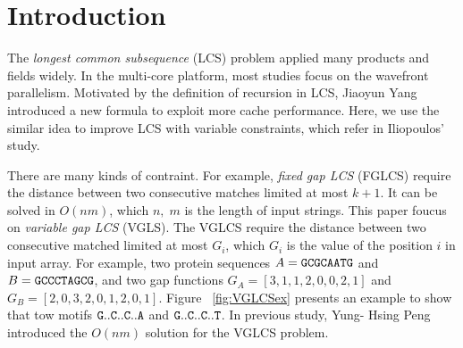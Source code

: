 \section{Introduction} %
\label{sec:Introduction}

The \emph{longest common subsequence} (LCS) problem applied many
products and fields widely.  In the multi-core platform, most studies
focus on the wavefront parallelism. Motivated by the definition of
recursion in LCS, Jiaoyun Yang introduced a new formula to exploit
more cache performance.  Here, we use the similar idea to improve LCS
with variable constraints, which refer in Iliopoulos' study. 

\iffalse
最長共同子序列 (\emph{longest common subsequence}, LCS)廣泛地使用在各個應用上。
在多核心平台下，大多數的研究專注於如何高效率地在波前平行 (wavefront parallelism)，
而 Jiaoyun Yang ~\cite{jiaoyun} 提出的論文中改變一般的 LCS 遞迴定義以得到更好快取使用率。
在這篇論文中，針對在 Iliopoulos ~\cite{iliopoulos} 提及的約束條件下的 LCS 問題使用相關的想法來改善效能。
\fi

There are many kinds of contraint.  For example, \emph{fixed gap LCS}
(FGLCS) require the distance between two consecutive matches limited
at most $k+1$.  It can be solved in $O(nm)$, which $n, \; m$ is the
length of input strings. This paper foucus on \emph{variable gap LCS}
(VGLS).  The VGLCS require the distance between two consecutive
matched limited at most $G_i$, which $G_i$ is the value of the
position $i$ in input array. For example, two protein sequences $A =
\tt{GCGCAATG}$ and $B = \tt{GCCCTAGCG}$, and two gap functions $G_A =
[3, 1, 1, 2, 0, 0, 2, 1]$ and $G_B = [2, 0, 3, 2, 0, 1, 2, 0, 1]$.
Figure ~\ref{fig:VGLCSex} presents an example to show that tow motifs
$\tt{G..C..C..A}$ and $\tt{G..C..C..T}$.  In previous study, Yung-
Hsing Peng \cite{Yang2010AnEP} introduced the $O(nm)$ solution for the
VGLCS problem.

\iffalse
在約束條件下的 LCS 中，如 \emph{fixed gap LCS } (FGLCS)要求任兩個挑選的距離在相對應的另一個字串中相等，
同時距離最大為 $k+1$，可在時間複雜度在 $O(nm)$ 內解決，其中 $n$, $m$ 分別為兩個輸入的字串長度。
我們將在這篇論文針對 \emph{variable gap LCS} (VGLCS) 進行探討。
在 VGLCS 中，對各個不同的位置提供約束限制，如目前給定兩個字串 $A = \tt{GCGCAATG}$, 
$B = \tt{GCCCTAGCG}$，各自的約束限制為 $G_A = [3, 1, 1, 2, 0, 0, 2, 1]$ 
和 $G_B = [2, 0, 3, 2, 0, 1, 2, 0, 1]$，其中 $G_A(i)$ 表示當挑選第 $i$ 個位置時，與前一個挑選的位置最多差 $G_A(i)+1$，同理 $G_B(i)$；
我們可以得到兩組 VGLCS 的解 $\tt{GCCA}$ 和 $\tt{GCCT}$，挑選的方式如圖 ~\ref{fig:VGLCSex}。
在 Yung-Hsing Peng ~\cite{yunghsing} 的論文已對 VGLCS 提出易於實作的 $O(nm \alpha(n))$ 和理論 $O(nm)$ 的解法。
\fi


